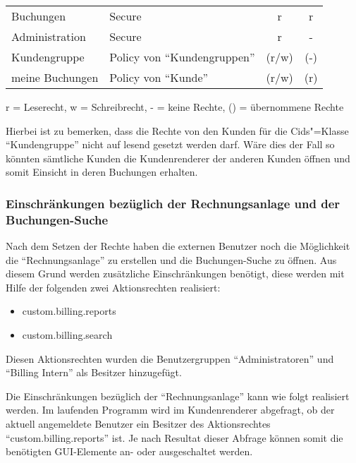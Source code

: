 \begin{minipage}{\linewidth}
\centering
{} \label{tab:katalogrechte}
\begin{tabulary}{\textwidth}{|l|L|C|c|}
 \hline
  &  &  &  \tabularnewline
 \hline 
 Buchungen & Secure & r & r \\ 
 \hline 
 Administration & Secure &r & - \\ 
 \hline 
 Kundengruppe & Policy von "`Kundengruppen"' & (r/w) & (-) \\ 
 \hline 
 meine Buchungen & Policy von "`Kunde"' & (r/w) & (r) \\ 
 \hline 
 \end{tabulary}
 \par
 \bigskip
 r = Leserecht, w = Schreibrecht, - = keine Rechte, () = übernommene Rechte
 \end{minipage}
 
Hierbei ist zu bemerken, dass die Rechte von den Kunden für die Cids"=Klasse "`Kundengruppe"' nicht auf lesend gesetzt werden darf. Wäre dies der Fall so könnten sämtliche Kunden die Kundenrenderer der anderen Kunden öffnen und somit Einsicht in deren Buchungen erhalten.

\subsubsection{Einschränkungen bezüglich der Rechnungsanlage und der Buchungen-Suche}

Nach dem Setzen der Rechte haben die externen Benutzer noch die Möglichkeit die \enquote{Rechnungsanlage} zu erstellen und die Buchungen-Suche zu öffnen.
Aus diesem Grund werden zusätzliche Einschränkungen benötigt, diese werden mit Hilfe der folgenden zwei Aktionsrechten realisiert:
\begin{itemize}
\item custom.billing.reports
\item custom.billing.search
\end{itemize}
Diesen Aktionsrechten wurden die Benutzergruppen "`Administratoren"' und "`Billing Intern"' als Besitzer hinzugefügt.

Die Einschränkungen bezüglich der \enquote{Rechnungsanlage} kann wie folgt realisiert werden.
Im laufenden Programm wird im Kundenrenderer abgefragt, ob der aktuell angemeldete Benutzer ein Besitzer des Aktionsrechtes "`custom.billing.reports"' ist.
Je nach Resultat dieser Abfrage können somit die benötigten GUI-Elemente an- oder ausgeschaltet werden.


